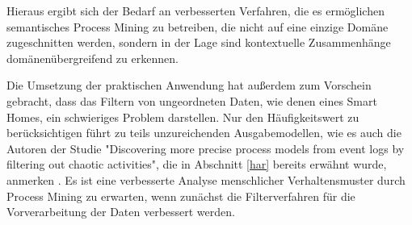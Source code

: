 Hieraus ergibt sich der Bedarf an verbesserten Verfahren, die es ermöglichen semantisches Process Mining zu betreiben, die nicht auf eine einzige Domäne zugeschnitten werden, sondern in der Lage sind kontextuelle Zusammenhänge domänenübergreifend zu erkennen.

Die Umsetzung der praktischen Anwendung hat außerdem zum Vorschein gebracht, dass das Filtern von ungeordneten Daten, wie denen eines Smart Homes, ein schwieriges Problem darstellen. Nur den Häufigkeitswert zu berücksichtigen führt zu teils unzureichenden Ausgabemodellen, wie es auch die Autoren der Studie "Discovering more precise process models from event logs by filtering out chaotic activities", die in Abschnitt \ref{har} bereits erwähnt wurde, anmerken \cite{Tax2019}. Es ist eine verbesserte Analyse menschlicher Verhaltensmuster durch Process Mining zu erwarten, wenn zunächst die Filterverfahren für die Vorverarbeitung der Daten verbessert werden.
